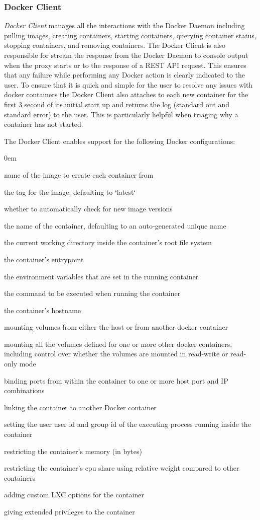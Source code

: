 \documentclass[a4paper,11pt,twoside]{report}
\begin{document}
\subsubsection*{Docker Client}
\textit{Docker Client} manages all the interactions with the Docker Daemon including pulling images, creating containers, starting containers, querying container status, stopping containers, and removing containers.  The Docker Client is also responsible for stream the response from the Docker Daemon to console output when the proxy starts or to the response of a REST API request.  This ensures that any failure while performing any Docker action is clearly indicated to the user.  To ensure that it is quick and simple for the user to resolve any issues with docker containers the Docker Client also attaches to each new container for the first 3 second of its initial start up and returns the log (standard out and standard error) to the user.  This is particularly helpful when triaging why a container has not started.

\noindent
The Docker Client enables support for the following Docker configurations:
	\begin{list}{-}{}
		\itemsep0em	
		\item name of the image to create each container from
		\item the tag for the image, defaulting to `latest`
		\item whether to automatically check for new image versions
		\item the name of the container, defaulting to an auto-generated unique name
		\item the current working directory inside the container's root file system
		\item the container's entrypoint
		\item the environment variables that are set in the running container
		\item the command to be executed when running the container
		\item the container's hostname
		\item mounting volumes from either the host or from another docker container
		\item mounting all the volumes defined for one or more other docker containers, including control over whether the volumes are mounted in read-write or read-only mode
		\item binding ports from within the container to one or more host port and IP combinations
		\item linking the container to another Docker container
		\item setting the user user id and group id of the executing process running inside the container
		\item restricting the container's memory (in bytes)
		\item restricting the container's cpu share using relative weight compared to other containers
		\item adding custom LXC options for the container
		\item giving extended privileges to the container
	\end{list}
	
\end{document}
